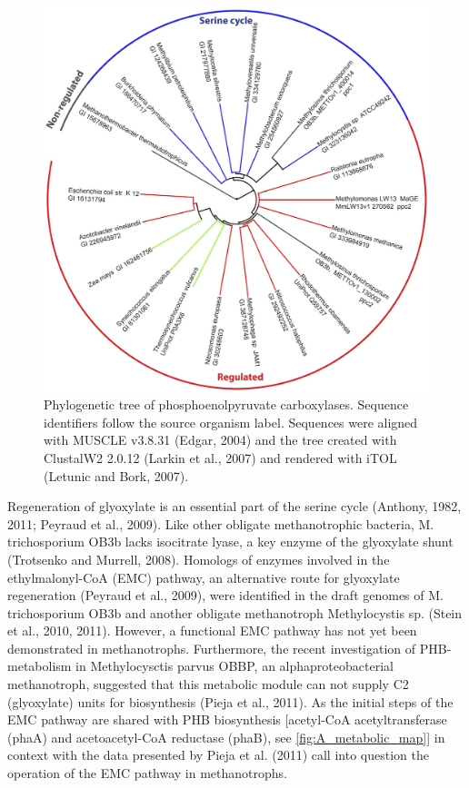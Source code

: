 \begin{figure}[H]
\centering
     \includegraphics[width=1.0\textwidth]{./tex/chapter1/figures/figure3.png}
     \caption{Phylogenetic tree of phosphoenolpyruvate carboxylases.
        Sequence identifiers follow the source organism label. Sequences were aligned with MUSCLE v3.8.31 (Edgar, 2004) and
        the tree created with ClustalW2 2.0.12 (Larkin et al., 2007) and rendered with iTOL (Letunic and Bork, 2007).}
     \label{fig:B_pep}
\end{figure}

Regeneration of glyoxylate is an essential part of the serine cycle (Anthony, 1982, 2011; Peyraud et al., 2009).
Like other obligate methanotrophic bacteria, M. trichosporium OB3b lacks isocitrate lyase, a key enzyme of the glyoxylate shunt (Trotsenko and Murrell, 2008).
Homologs of enzymes involved in the ethylmalonyl-CoA (EMC) pathway, an alternative route for glyoxylate regeneration (Peyraud et al., 2009), were identified in the draft genomes of M. trichosporium OB3b and another obligate methanotroph Methylocystis sp. (Stein et al., 2010, 2011).
However, a functional EMC pathway has not yet been demonstrated in methanotrophs.
Furthermore, the recent investigation of PHB-metabolism in Methylocysctis parvus OBBP, an alphaproteobacterial methanotroph, suggested that this metabolic module can not supply C2 (glyoxylate) units for biosynthesis (Pieja et al., 2011).
As the initial steps of the EMC pathway are shared with PHB biosynthesis [acetyl-CoA acetyltransferase (phaA) and acetoacetyl-CoA reductase (phaB), see \ref{fig:A_metabolic_map}] in context with the data presented by Pieja et al. (2011) call into question the operation of the EMC pathway in methanotrophs.

